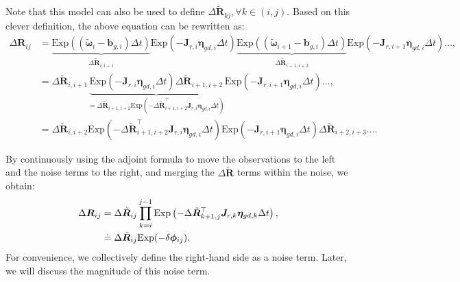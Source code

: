 Note that this model can also be used to define $\Delta \tilde{\bm{R}}_{kj}, \forall k \in (i,j)$. Based on this clever definition, the above equation can be rewritten as:
\begin{equation}\label{eq:approx-delta-R}
	\begin{aligned}
		\Delta \bm{R}_{ij} &= \underbrace{\mathrm{Exp}\left((\tilde{\boldsymbol{\omega}}_i - 
			\bm{b}_{g,i}) \Delta t \right)}_{\Delta\tilde{\bm{R}}_{i, i+1}} \mathrm{Exp} \left(-\bm{J}_{r,i} 
		\boldsymbol{\eta}_{gd, i} \Delta t \right) 
		\underbrace{\mathrm{Exp}\left((\tilde{\boldsymbol{\omega}}_{i+1} - \bm{b}_{g,i}) \Delta t 
			\right)}_{\Delta \tilde{\bm{R}}_{i+1, i+2}}\mathrm{Exp} \left(-\bm{J}_{r,i+1} 
		\boldsymbol{\eta}_{gd, i} \Delta t \right) \ldots, \\
		&= \Delta \tilde{\bm{R}}_{i, i+1} \underbrace{\mathrm{Exp} \left(-\bm{J}_{r,i} 
			\boldsymbol{\eta}_{gd, i} \Delta t \right)\Delta\tilde{\bm{R}}_{i+1, i+2}}_{=\Delta 
			\tilde{\bm{R}}_{i+1, i+2} \mathrm{Exp}(-\Delta \tilde{\bm{R}}_{i+1, i+2}^\top \bm{J}_{r,i} 
			\boldsymbol{\eta}_{gd, i} \Delta t)} \mathrm{Exp} \left(-\bm{J}_{r,i+1} \boldsymbol{\eta}_{gd, i} 
		\Delta t \right) \ldots, \\
		&=\Delta \tilde{\bm{R}}_{i, i+2} \mathrm{Exp}(-\Delta \tilde{\bm{R}}_{i+1, i+2}^\top 
		\bm{J}_{r,i} \boldsymbol{\eta}_{gd, i} \Delta t) \mathrm{Exp} \left(-\bm{J}_{r,i+1} 
		\boldsymbol{\eta}_{gd, i} \Delta t \right) \Delta \tilde{\bm{R}}_{i+2, i+3} \ldots .
	\end{aligned}
\end{equation}

By continuously using the adjoint formula to move the observations to the left and the noise terms to the right, and merging the $\Delta \tilde{\bm{R}}$ terms within the noise, we obtain:
\begin{equation}\label{eq:def-of-delta-R}
	\begin{aligned}
		\Delta \bm{R}_{ij} &= \Delta \tilde{\bm{R}}_{ij} \prod_{k=i}^{j-1} \mathrm{Exp}\left( -\Delta 
		\tilde{\bm{R}}_{k+1, j}^\top \bm{J}_{r,k} \boldsymbol{\eta}_{gd, k} \Delta t \right), \\
		& \buildrel\textstyle.\over= \Delta \tilde{\bm{R}}_{ij} \mathrm{Exp} (-\delta \boldsymbol{\phi}_{ij}).
	\end{aligned}
\end{equation}
For convenience, we collectively define the right-hand side as a noise term. Later, we will discuss the magnitude of this noise term.

